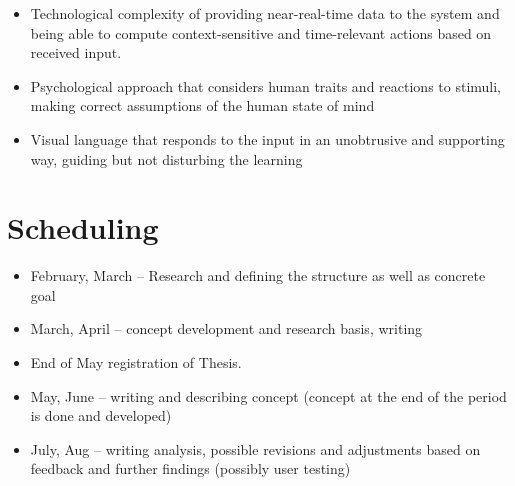 \begin{itemize}
	\item Technological complexity of providing near-real-time data to the system and being able to compute context-sensitive and time-relevant actions based on received input.
	\item Psychological approach that considers human traits and reactions to stimuli, making correct assumptions of the human state of mind
	\item Visual language that responds to the input in an unobtrusive and supporting way, guiding but not disturbing the learning  \cite{dix2003human,few2013information}
\end{itemize}



\section{Scheduling}
\begin{itemize}
	\item February, March – Research and defining the structure as well as concrete goal
	\item March, April – concept development and research basis, writing
	\item End of May registration of Thesis.
	\item May, June – writing and describing concept (concept at the end of the period is done and developed)
	\item July, Aug – writing analysis, possible revisions and adjustments based on feedback and further findings (possibly user testing)
\end{itemize}

